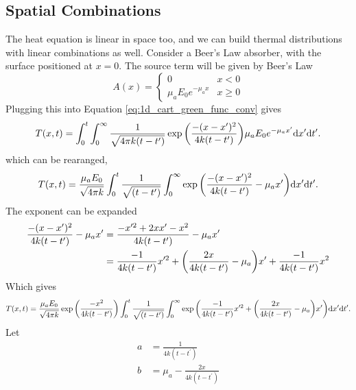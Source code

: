 \documentclass[letterpaper,10pt]{article}
\begin{document}

  \subsection{Spatial Combinations}
  \label{sub:spatial_combinations}

  The heat equation is linear in space too, and we can build thermal distributions with linear combinations as well.
  Consider a Beer's Law absorber, with the surface positioned at $x = 0$. The source term will be given by Beer's Law
  \begin{equation}
    \label{eq:beers_law}
    A(x) = \begin{cases}
      0 & x < 0 \\
      \mu_a E_0 e^{-\mu_a x} & x \ge 0
    \end{cases}
  \end{equation}
  Plugging this into Equation \ref{eq:1d_cart_green_func_conv} gives
  \begin{equation}
    T(x,t) = \int_0^t \int_{0}^{\infty}
    \frac{1}{\sqrt{4\pi k (t-t^\prime)}} \exp\qty(\frac{-(x-x^\prime)^2}{4k(t-t^\prime)})
    \mu_a E_0 e^{-\mu_a x^\prime}
    \dd x^\prime \dd t^\prime.
  \end{equation}
  which can be rearanged,
  \begin{equation}
    T(x,t) =
    \frac{\mu_a E_0}{\sqrt{4\pi k}}
    \int_0^t
    \frac{1}{\sqrt{(t-t^\prime)}}
    \int_{0}^{\infty}
    \exp\qty(\frac{-(x-x^\prime)^2}{4k(t-t^\prime)}-\mu_a x^\prime)
    \dd x^\prime \dd t^\prime.
  \end{equation}
  The exponent can be expanded
  \begin{align}
    \frac{-(x-x^\prime)^2}{4k(t-t^\prime)}-\mu_a x^\prime
&=
\frac{-x^{\prime 2} + 2xx^\prime - x^2}{4k(t-t^\prime)}-\mu_a x^\prime \\
&=
\frac{-1}{4k(t-t^\prime)} x^{\prime 2}
+
\qty(\frac{2x}{4k(t-t^\prime)} -\mu_a) x^{\prime}
+
\frac{-1}{4k(t-t^\prime)} x^{2}
\end{align}
Which gives
\begin{equation}
  T(x,t) =
  \frac{\mu_a E_0}{\sqrt{4\pi k}}
  \exp\qty(\frac{-x^{2}}{4k(t-t^\prime)} )
  \int_0^t
  \frac{1}{\sqrt{(t-t^\prime)}}
  \int_{0}^{\infty}
  \exp\qty(
  \frac{-1}{4k(t-t^\prime)} x^{\prime 2}
  +
  \qty(\frac{2x}{4k(t-t^\prime)} -\mu_a) x^{\prime}
  )
  \dd x^\prime \dd t^\prime.
\end{equation}
Let
\begin{align}
  a &=
  \frac{1}{4k(t-t^\prime)} \\
  b &=
  \mu_a - \frac{2x}{4k(t-t^\prime)}
\end{align}
\end{document}
